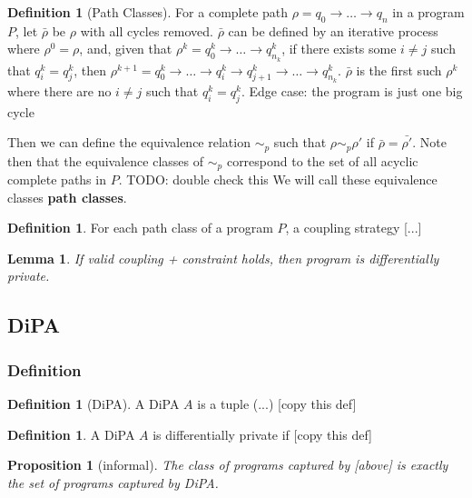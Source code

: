 \documentclass[12pt]{article}
\newtheorem{lemma}[thm]{Lemma}
\newtheorem{prop}[thm]{Proposition}
\theoremstyle{definition}
\newtheorem{defn}[thm]{Definition}
\begin{document}
\begin{defn}[Path Classes]
    For a complete path $\rho=q_0\to \ldots \to q_n$ in a program $P$, let $\bar{\rho}$ be $\rho$ with all cycles removed. $\bar{\rho}$ can be defined by an iterative process where $\rho^0 = \rho$, and, given that $\rho^k =q_0^k\to \ldots \to q_{n_k}^k$, if there exists some $i\neq j$ such that $q_i^k=q_j^k$, then $\rho^{k+1} = q_0^k\to \ldots \to q_i^k \to q_{j+1}^k\to \ldots\to q_{n_k}^k$. $\bar{\rho}$ is the first such $\rho^k$ where there are no $i\neq j$ such that $q_i^k=q_j^k$. 
    {\color{red} Edge case: the program is just one big cycle}

    Then we can define the equivalence relation $\sim_p$ such that $\rho\sim_p\rho'$ if $\bar{\rho} = \bar{\rho'}$. Note then that the equivalence classes of $\sim_p$ correspond to the set of all acyclic complete paths in $P$. {\color{red} TODO: double check this} We will call these equivalence classes \textbf{path classes}.
\end{defn}

\begin{defn}
    For each path class of a program $P$, a coupling strategy [...]
\end{defn}

\begin{lemma}
    If valid coupling + constraint holds, then program is differentially private. 
\end{lemma}

\subsection{DiPA}

\subsubsection{Definition}

\begin{defn}[DiPA]
    A DiPA $A$ is a tuple (...) [copy this def]
\end{defn}

\begin{defn}
    A DiPA $A$ is differentially private if [copy this def]
\end{defn}

\begin{prop}[informal]
    The class of programs captured by [above] is exactly the set of programs captured by DiPA. 
\end{prop}
\end{document}
